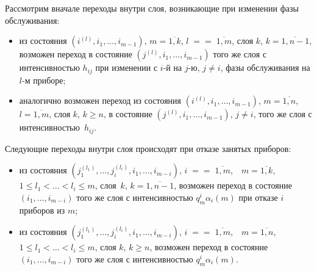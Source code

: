 \begin{multicols}{2}
Рассмотрим вначале переходы внутри слоя, возникающие при
изменении фазы обслуживания:
\begin{itemize}
\item из состояния $\left ( i^{(l)},i_1,\ldots,i_{m-1}\right )$,
$m=\overline{1,k}$, $l\;=$\linebreak $=\;\overline{1,m}$,
слоя $k$, $k=\overline{1,n-1}$, возможен переход в состояние
$\left( j^{(l)},i_1,\ldots, i_{m-1}\right )$ того же слоя с интенсивностью $h_{ij}$
при изменении с $i$-й на $j$-ю, $j\ne i$, фазы обслуживания на $l$-м
приборе;
\item
аналогично возможен переход из состояния
$\left ( i^{(l)},i_1,\ldots,i_{m-1}\right )$, $m=\overline{1,n}$,
$l=\overline{1,m}$, слоя $k$,  $k\ge n$, в состояние
$\left ( j^{(l)},i_1,\ldots,i_{m-1}\right )$, $j\ne i$, того же слоя
с интенсивностью~$h_{ij}$.
\end{itemize}

Следующие переходы внутри слоя происходят при отказе занятых
приборов:
\begin{itemize}
\item из состояния $\left (j_1^{(l_1)},\ldots,j_i^{(l_i)},i_1,\ldots,i_{m-i}\right )$,
$i\;=$\linebreak $=\;\overline{1,m}$,\ \ $m=\overline{1,k}$,
$1\le l_1<\ldots<l_i\le m$, слоя~$k$, $k=\overline{1,n-1}$,
возможен переход в состояние $(i_1,\ldots,i_{m-i})$ того же слоя
с интенсивностью $q^{i}_{m}\alpha_i(m)$ при отказе $i$ приборов из $m$;
\item
из состояния $\left ( j_1^{(l_1)},\ldots,j_i^{(l_i)},i_1,\ldots,i_{m-i}\right )$,
$i\;=$\linebreak $=\;\overline{1,m}$,\ \ $m=\overline{1,n}$,
$1\le l_1<\ldots<l_i\le m$, слоя $k$, $k\ge n$,
возможен переход в состояние $(i_1,\ldots, i_{m-i})$ того же слоя с
интенсивностью $q^i_m\alpha_i(m)$.
\end{itemize}


\end{multicols}
